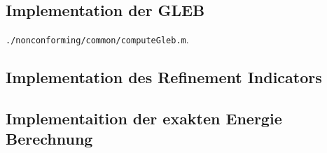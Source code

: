 \subsection{Implementation der GLEB}
\begin{center}
  \texttt{./nonconforming/common/computeGleb.m}.
\end{center}

\subsection{Implementation des Refinement Indicators}

\subsection{Implementaition der exakten Energie Berechnung}


